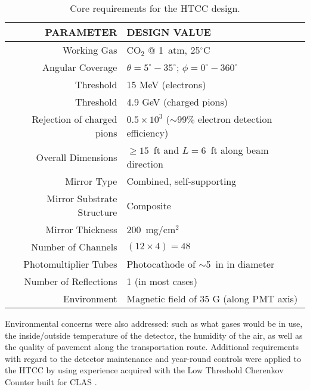 \begin{table*}[t]
	\centering
	\caption{Core requirements for the HTCC design.}
	\begin{tabular}{ | r | l | }
		\hline
		PARAMETER & DESIGN VALUE \\ 
		\hline
		Working Gas & CO$_2$ @ 1~atm, 25$^\circ$C  \\ 
		\hline
		Angular Coverage & $\theta = 5^\circ - 35^\circ$; $\phi = 0^\circ - 360^\circ$ \\
		\hline
		Threshold & 15 MeV (electrons) \\
		\hline
		Threshold & 4.9 GeV (charged pions) \\
		\hline
		Rejection of charged pions & $0.5 \times 10^3$  ($\sim99\%$ electron detection efficiency)  \\
		\hline
		Overall Dimensions & $\geq 15$~ft and $L = 6$~ft along beam direction  \\
		\hline
		Mirror Type & Combined, self-supporting  \\
		\hline
		Mirror Substrate Structure & Composite  \\
		\hline
		Mirror Thickness & 200~mg/cm$^2$  \\
		\hline
		Number of Channels & $(12 \times 4) = 48$  \\
		\hline
		Photomultiplier Tubes & Photocathode of $\sim$5~in in diameter  \\
		\hline
		Number of Reflections & 1 (in most cases)   \\
		\hline
		Environment & Magnetic field of 35 G (along PMT axis)   \\
		\hline
	\end{tabular}
	\label{tab:1}
\end{table*}

Environmental concerns were also addressed: such as what gases would be in use, the inside/outside temperature of the detector,
the humidity of the air, as well as the quality of pavement along the transportation route.
Additional requirements with regard to the detector maintenance and year-round controls were applied
to the HTCC by using experience acquired with the Low Threshold Cherenkov Counter built for CLAS
\cite{Adams:2001kk}.
